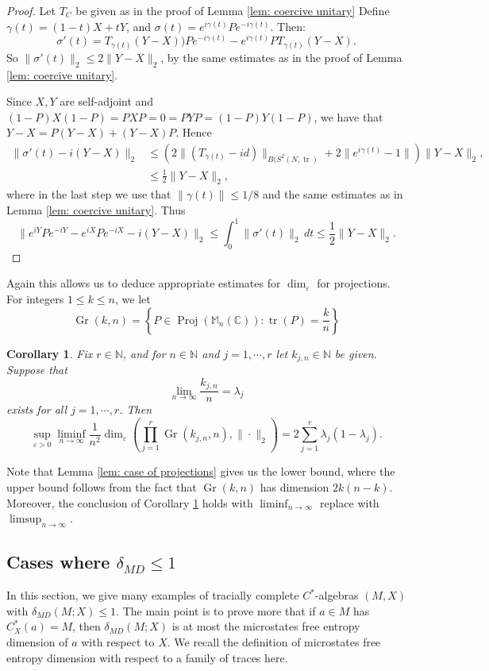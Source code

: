 \documentclass[10pt]{amsart}
\newtheorem{cor}[thm]{Corollary}
\theoremstyle{definition}
\numberwithin{equation}{section}
\newcommand{\bC}{{\mathbb C}}
\newcommand{\bM}{{\mathbb M}}
\newcommand{\bN}{{\mathbb N}}
\DeclareMathOperator{\tr}{tr}
\DeclareMathOperator{\Proj}{Proj}
\DeclareMathOperator{\Gr}{Gr}
\begin{document}
\begin{proof}
Let $T_{C}$ be given as in the proof of Lemma \ref{lem: coercive unitary}
Define $\gamma(t)=(1-t)X+tY$, and $\sigma(t)=e^{i\gamma(t)}Pe^{-i\gamma(t)}$. Then:
\[\sigma'(t)=T_{\gamma(t)}(Y-X))Pe^{-i\gamma(t)}-e^{i\gamma(t)}PT_{\gamma(t)}(Y-X).\]
So $\|\sigma'(t)\|_{2}\leq 2\|Y-X\|_{2}$, by the same estimates as in the proof of Lemma \ref{lem: coercive unitary}.

Since $X,Y$ are self-adjoint and $(1-P)X(1-P)=PXP=0=PYP=(1-P)Y(1-P)$, we have that $Y-X=P(Y-X)+(Y-X)P$. 
Hence 
\begin{align*}
 \|\sigma'(t)-i(Y-X)\|_{2}&\leq \left(2\|(T_{\gamma(t)}-id)\|_{B(S^{2}(N,\tr)}+2\|e^{i\gamma(t)}-1\|\right)\|Y-X\|_{2},\\
 &\leq \frac{1}{2}\|Y-X\|_{2},
\end{align*}
where in the last step we use that $\|\gamma(t)\|\leq 1/8$ and the same estimates as in Lemma \ref{lem: coercive unitary}.
Thus
\[\|e^{iY}Pe^{-iY}-e^{iX}Pe^{-iX}-i(Y-X)\|_{2}\leq \int_{0}^{1}\|\sigma'(t)\|_{2}\,dt\leq \frac{1}{2}\|Y-X\|_{2}.\]

\end{proof}

Again this allows us to deduce appropriate estimates for $\dim_{\varepsilon}$ for projections.
For integers $1\leq k\leq n$, we let 
\[\Gr(k,n)=\left\{P\in \Proj(\bM_{n}(\bC)):\tr(P)=\frac{k}{n}\right\}\]
\begin{cor}\label{cor: projection lower bound}
Fix $r\in \bN$, and for $n\in\bN$ and $j=1,\cdots,r$ let $k_{j,n}\in \bN$ be given. Suppose that 
\[\lim_{n\to\infty}\frac{k_{j,n}}{n}=\lambda_{j}\]
exists for all $j=1,\cdots,r$.
Then
\[\sup_{\varepsilon>0}\liminf_{n\to\infty}\frac{1}{n^{2}}\dim_{\varepsilon}\left(\prod_{j=1}^{r}\Gr(k_{j,n},n),\|\cdot\|_{2}\right)= 2\sum_{j=1}^{r}\lambda_{j}(1-\lambda_{j}).\]

\end{cor}
Note that Lemma \ref{lem: case of projections} gives us the lower bound, where the upper bound follows from the fact that $\Gr(k,n)$ has dimension $2k(n-k)$. Moreover, the conclusion of Corollary \ref{cor: projection lower bound} holds with $\liminf_{n\to\infty}$ replace with $\limsup_{n\to\infty}$. 

\subsection{Cases where $\delta_{MD}\leq 1$}

In this section, we give many examples of tracially complete $C^{*}$-algebras $(M,X)$ with $\delta_{MD}(M;X)\leq 1$. The main point is to prove more that if $a\in M$ has $C^{*}_{X}(a)=M$, then $\delta_{MD}(M;X)$ is at most the microstates free entropy dimension of $a$ with respect to $X$. 
We recall the definition of  microstates free entropy dimension with respect to a family of traces here. 
\end{document}
